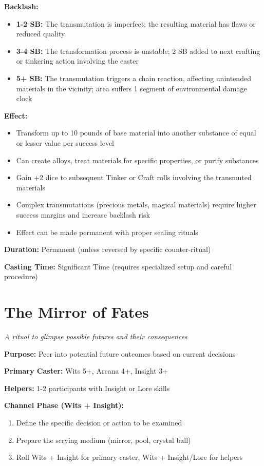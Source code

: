 \textbf{Backlash:}
\begin{itemize}
\item \textbf{1-2 SB:} The transmutation is imperfect; the resulting material has flaws or reduced quality
\item \textbf{3-4 SB:} The transformation process is unstable; 2 SB added to next crafting or tinkering action involving the caster
\item \textbf{5+ SB:} The transmutation triggers a chain reaction, affecting unintended materials in the vicinity; area suffers 1 segment of environmental damage clock
\end{itemize}

\textbf{Effect:}
\begin{itemize}
\item Transform up to 10 pounds of base material into another substance of equal or lesser value per success level
\item Can create alloys, treat materials for specific properties, or purify substances
\item Gain +2 dice to subsequent Tinker or Craft rolls involving the transmuted materials
\item Complex transmutations (precious metals, magical materials) require higher success margins and increase backlash risk
\item Effect can be made permanent with proper sealing rituals
\end{itemize}

\textbf{Duration:} Permanent (unless reversed by specific counter-ritual)

\textbf{Casting Time:} Significant Time (requires specialized setup and careful procedure)

\section*{The Mirror of Fates}
\textit{A ritual to glimpse possible futures and their consequences}

\textbf{Purpose:} Peer into potential future outcomes based on current decisions

\textbf{Primary Caster:} Wits 5+, Arcana 4+, Insight 3+

\textbf{Helpers:} 1-2 participants with Insight or Lore skills

\textbf{Channel Phase (Wits + Insight):}
\begin{enumerate}
\item Define the specific decision or action to be examined
\item Prepare the scrying medium (mirror, pool, crystal ball)
\item Roll Wits + Insight for primary caster, Wits + Insight/Lore for helpers
\end{enumerate}

